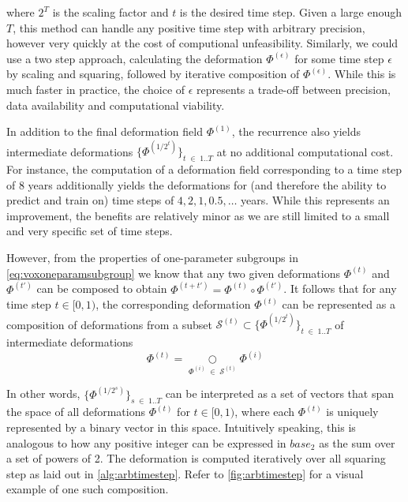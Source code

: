 where $2^T$ is the scaling factor and $t$ is the desired time step. Given a large enough $T$, this method can handle any positive time step with arbitrary precision, however very quickly at the cost of computional unfeasibility. Similarly, we could use a two step approach, calculating the deformation $\Phi^{(\epsilon)}$ for some time step $\epsilon$ by scaling and squaring, followed by iterative composition of $\Phi^{(\epsilon)}$. While this is much faster in practice, the choice of $\epsilon$ represents a trade-off between precision, data availability and computational viability.

In addition to the final deformation field $\Phi^{(1)}$, the recurrence also yields intermediate deformations $\{ \Phi^{(1 / 2^{t})} \}_{t \; \in \; 1 .. T} $ at no additional computational cost. For instance, the computation of a deformation field corresponding to a time step of 8 years additionally yields the deformations for (and therefore the ability to predict and train on) time steps of ${ 4, 2, 1, 0.5, \ldots }$ years. While this represents an improvement, the benefits are relatively minor as we are still limited to a small and very specific set of time steps.

However, from the properties of one-parameter subgroups in \autoref{eq:voxoneparamsubgroup} we know that any two given deformations $\Phi^{(t)}$ and $\Phi^{(t')}$ can be composed to obtain ${ \Phi^{(t + t')} = \Phi^{(t)} \circ \Phi^{(t')} }$. It follows that for any time step $t \in [0, 1)$, the corresponding deformation $\Phi^{(t)}$ can be represented as a composition of deformations from a subset $\mathcal{S}^{(t)} \subset \{ \Phi^{(1 / 2^{t})} \}_{t \; \in \; 1 .. T} $ of intermediate deformations
\begin{equation}
	\Phi^{(t)} = \underset{\Phi^{(i)} \; \in \; \mathcal{S}^{(t)}}{\bigcirc} \Phi^{(i)}
\end{equation}

In other words, $\{ \Phi^{(1 / 2^{s})} \}_{s \; \in \; 1 .. T}$ can be interpreted as a set of vectors that span the space of all deformations $\Phi^{(t)}$ for $t \in [0, 1)$, where each $\Phi^{(t)}$ is uniquely represented by a binary vector in this space. Intuitively speaking, this is analogous to how any positive integer can be expressed in $base_2$ as the sum over a set of powers of 2. The deformation is computed iteratively over all squaring step as laid out in \autoref{alg:arbtimestep}. Refer to \autoref{fig:arbtimestep} for a visual example of one such composition.

